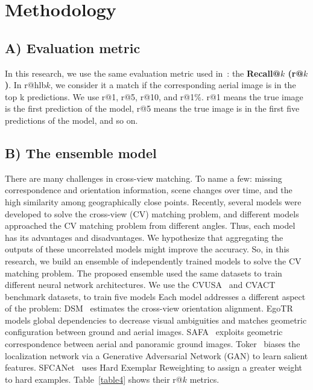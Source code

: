 \documentclass[10pt,letterpaper]{article}
\newif\ifhighlight
\newcommand{\hlb}[1]{\ifhighlight{\hl{#1}}\else{#1}\fi}
\begin{document}
\section*{Methodology}
\subsection*{A) Evaluation metric}
In this research, we use the same evaluation metric used in~\cite{bib3,bib4,bib5,bib8,bib13,bib14,bib17,bib18,bib19,bib20,bib21,bib22,bib24,bib36,bib43,bib44,bib45,bib46,bib47,bib49,bib50}: the {\bf Recall@$k$ (r@$k$)}. In r@hlb{$k$}, we consider it a match if the corresponding aerial image is in the top k predictions. We use r@1, r@5, r@10, and r@1\%. r@1 means the true image is the first prediction of the model, r@5 means the true image is in the first five predictions of the model, and so on.

\subsection*{B) The ensemble model}

There are many challenges in cross-view matching. To name a few:  missing correspondence and orientation information, scene changes over time, and the high similarity among geographically close points. Recently, several models were developed to solve the cross-view (CV) matching problem, and different models approached the CV matching problem from different angles. Thus, each model has its advantages and disadvantages. We hypothesize that aggregating the outputs of these uncorrelated models might improve the accuracy.
So, in this research, we build an ensemble of independently trained models to solve the CV matching problem. The proposed ensemble used the same datasets to train different neural network architectures. We use the CVUSA~\cite{bib55} and CVACT~\cite{bib4} benchmark datasets, to train five models Each model addresses a  different aspect of the problem: DSM~\cite{bib13} estimates the cross-view orientation alignment.  EgoTR~\cite{bib19} models global dependencies to decrease visual ambiguities and matches geometric configuration between ground and aerial images. SAFA~\cite{bib46} exploits geometric correspondence between aerial and panoramic ground images. Toker~\cite{bib18} biases the localization network via a Generative Adversarial Network (GAN) to learn salient features. SFCANet~\cite{bib45} uses Hard Exemplar Reweighting to assign a greater weight to hard examples. Table~\ref{table4} shows their r@\hlb{$k$} metrics.
\end{document}
